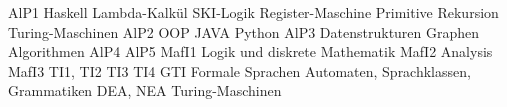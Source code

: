 AlP1
	Haskell
	Lambda-Kalkül
	SKI-Logik
	Register-Maschine
	Primitive Rekursion
	Turing-Maschinen
AlP2
	OOP
	JAVA
	Python
AlP3
	Datenstrukturen
	Graphen
	Algorithmen
AlP4
AlP5
MafI1
	Logik und diskrete Mathematik
MafI2
	Analysis
MafI3
TI1, TI2
TI3
TI4
GTI
	Formale Sprachen
	Automaten, Sprachklassen, Grammatiken
	DEA, NEA
	Turing-Maschinen